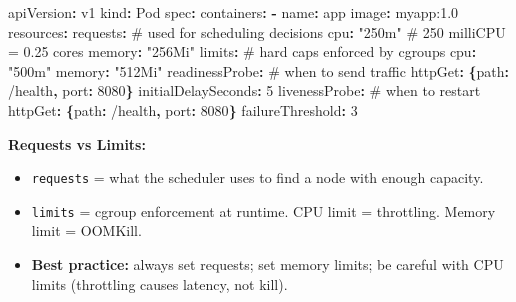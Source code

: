 \documentclass[11pt]{article}
\providecommand{\tightlist}{\setlength{\itemsep}{1pt}\setlength{\parskip}{0pt}}
\newenvironment{Shaded}{\begin{snugshade}}{\end{snugshade}}
\newcommand{\AttributeTok}[1]{\textcolor[rgb]{0.16,0.50,0.73}{#1}}
\newcommand{\CommentTok}[1]{\textcolor[rgb]{0.48,0.49,0.49}{#1}}
\newcommand{\DecValTok}[1]{\textcolor[rgb]{0.96,0.45,0.00}{#1}}
\newcommand{\FunctionTok}[1]{\textcolor[rgb]{0.56,0.27,0.68}{#1}}
\newcommand{\KeywordTok}[1]{\textcolor[rgb]{0.81,0.81,0.76}{\textbf{#1}}}
\newcommand{\StringTok}[1]{\textcolor[rgb]{0.96,0.31,0.31}{#1}}
\begin{document}
\begin{Shaded}
\begin{Highlighting}[]
\FunctionTok{apiVersion}\KeywordTok{:}\AttributeTok{ v1}
\FunctionTok{kind}\KeywordTok{:}\AttributeTok{ Pod}
\FunctionTok{spec}\KeywordTok{:}
\AttributeTok{  }\FunctionTok{containers}\KeywordTok{:}
\AttributeTok{  }\KeywordTok{{-}}\AttributeTok{ }\FunctionTok{name}\KeywordTok{:}\AttributeTok{ app}
\AttributeTok{    }\FunctionTok{image}\KeywordTok{:}\AttributeTok{ myapp:1.0}
\AttributeTok{    }\FunctionTok{resources}\KeywordTok{:}
\AttributeTok{      }\FunctionTok{requests}\KeywordTok{:}\CommentTok{          \# used for scheduling decisions}
\AttributeTok{        }\FunctionTok{cpu}\KeywordTok{:}\AttributeTok{ }\StringTok{"250m"}\CommentTok{      \# 250 milliCPU = 0.25 cores}
\AttributeTok{        }\FunctionTok{memory}\KeywordTok{:}\AttributeTok{ }\StringTok{"256Mi"}
\AttributeTok{      }\FunctionTok{limits}\KeywordTok{:}\CommentTok{            \# hard caps enforced by cgroups}
\AttributeTok{        }\FunctionTok{cpu}\KeywordTok{:}\AttributeTok{ }\StringTok{"500m"}
\AttributeTok{        }\FunctionTok{memory}\KeywordTok{:}\AttributeTok{ }\StringTok{"512Mi"}
\AttributeTok{    }\FunctionTok{readinessProbe}\KeywordTok{:}\CommentTok{      \# when to send traffic}
\AttributeTok{      }\FunctionTok{httpGet}\KeywordTok{:}\AttributeTok{ }\KeywordTok{\{}\FunctionTok{path}\KeywordTok{:}\AttributeTok{ /health}\KeywordTok{,}\AttributeTok{ }\FunctionTok{port}\KeywordTok{:}\AttributeTok{ }\DecValTok{8080}\KeywordTok{\}}
\AttributeTok{      }\FunctionTok{initialDelaySeconds}\KeywordTok{:}\AttributeTok{ }\DecValTok{5}
\AttributeTok{    }\FunctionTok{livenessProbe}\KeywordTok{:}\CommentTok{       \# when to restart}
\AttributeTok{      }\FunctionTok{httpGet}\KeywordTok{:}\AttributeTok{ }\KeywordTok{\{}\FunctionTok{path}\KeywordTok{:}\AttributeTok{ /health}\KeywordTok{,}\AttributeTok{ }\FunctionTok{port}\KeywordTok{:}\AttributeTok{ }\DecValTok{8080}\KeywordTok{\}}
\AttributeTok{      }\FunctionTok{failureThreshold}\KeywordTok{:}\AttributeTok{ }\DecValTok{3}
\end{Highlighting}
\end{Shaded}

\textbf{Requests vs Limits:}

\begin{itemize}
\tightlist
\item
  \texttt{requests} = what the scheduler uses to find a node with enough capacity.
\item
  \texttt{limits} = cgroup enforcement at runtime. CPU limit = throttling. Memory limit = OOMKill.
\item
  \textbf{Best practice:} always set requests; set memory limits; be careful with CPU limits (throttling causes latency, not kill).
\end{itemize}
\end{document}
